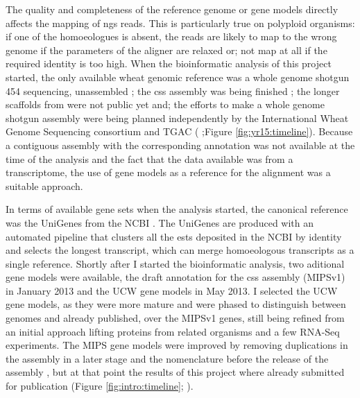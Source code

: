 The quality and completeness  of the reference genome or gene models directly affects the mapping of \gls{ngs} reads. 
This is particularly true on polyploid organisms: if one of the homoeologues is absent, the reads are likely to map to the wrong genome if the parameters of the aligner are relaxed or; not map at all if the required identity is too high.
When the bioinformatic analysis of this project started, the only available wheat genomic reference was a whole genome shotgun 454 sequencing, unassembled \citep{Brenchley2012}; the \gls{css} assembly was being finished \citep{Mayer2014}; the longer scaffolds from \citet{Chapman2015} were not public yet and; the efforts to make a whole genome shotgun assembly were being planned independently by the International Wheat Genome Sequencing consortium  \citep{Pozniak2016} and TGAC (\citealt{Clark2016} ;Figure \ref{fig:yr15:timeline}).  
Because a contiguous assembly with the corresponding annotation was not available at the time of the analysis and the fact that the data available was from a transcriptome, the use of gene models as a reference for the alignment was a suitable approach. 

In terms of available gene sets when the analysis started, the canonical reference was the UniGenes from the NCBI \citep{PontiusJUWagnerL2002}. 
The UniGenes are produced with an automated pipeline that clusters all the \glspl{est} deposited in the NCBI by identity and selects the longest transcript, which can merge homoeologous transcripts as a single reference.
Shortly after I started the bioinformatic analysis, two aditional gene models were available, the draft annotation for the \gls{css} assembly (MIPSv1) in January 2013 and the UCW gene models \citep{Krasileva2013} in May 2013. 
I selected the UCW gene models, as they were more mature and were phased to distinguish between genomes and already published, over the MIPSv1 genes, still being refined from an initial approach lifting proteins from related organisms and a few RNA-Seq experiments.  
The MIPS gene models were improved by removing duplications in the assembly in a later stage and the nomenclature before the release of the assembly \citep{Mayer2014}, but at that point the results of this project where already submitted for publication (Figure \ref{fig:intro:timeline}; \citealt{Ramirez-Gonzalez2015b}). 
 
